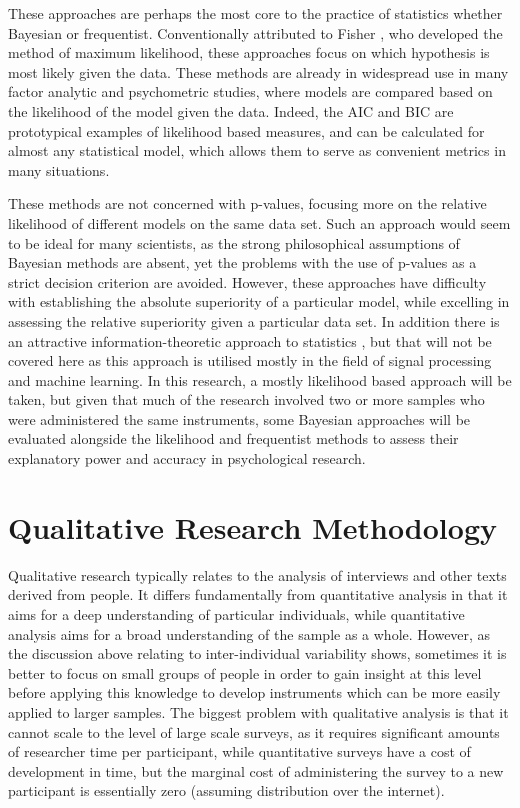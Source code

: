 These approaches are perhaps the most core to the practice of statistics whether Bayesian or frequentist. Conventionally attributed to Fisher \cite{salsburg2002lady}, who developed the method of maximum likelihood, these approaches focus on which hypothesis is most likely given the data. These methods are already in widespread use in many factor analytic and psychometric studies, where models are compared based on the likelihood of the model given the data. Indeed, the AIC and BIC are prototypical examples of likelihood based measures, and can be calculated for almost any statistical model, which allows them to serve as convenient metrics in many situations. 

These methods are not concerned with p-values, focusing more on the relative likelihood of different models on the same data set. Such an approach would seem to be ideal for many scientists, as the strong philosophical assumptions of Bayesian methods are absent, yet the problems with the use of p-values as a strict decision criterion are avoided. However, these approaches have difficulty with establishing the absolute superiority of a particular model, while excelling in assessing the relative superiority given a particular data set. In addition there is an attractive information-theoretic approach to statistics \cite{mackay2003information}, but that will not be covered here as this approach is utilised mostly in the field of signal processing and machine learning.  In this research, a mostly likelihood based approach will be taken, but given that much of the research involved two or more samples who were administered the same instruments, some Bayesian approaches will be evaluated alongside the likelihood and frequentist methods to assess their explanatory power and accuracy in psychological research.

\section{Qualitative Research Methodology}

Qualitative research typically relates to the analysis of interviews and other texts derived from people. It differs fundamentally from quantitative analysis in that it aims for a deep understanding of particular individuals, while quantitative analysis aims for a broad understanding of the sample as a whole. However, as the discussion above relating to inter-individual variability shows, sometimes it is better to focus on small groups of people in order to gain insight at this level before applying this knowledge to develop instruments which can be more easily applied to larger samples. The biggest problem with qualitative analysis is that it cannot scale to the level of large scale surveys, as it requires significant amounts of researcher time per participant, while quantitative surveys have a cost of development in time, but the marginal cost of administering the survey to a new participant is essentially zero (assuming distribution over the internet). 

